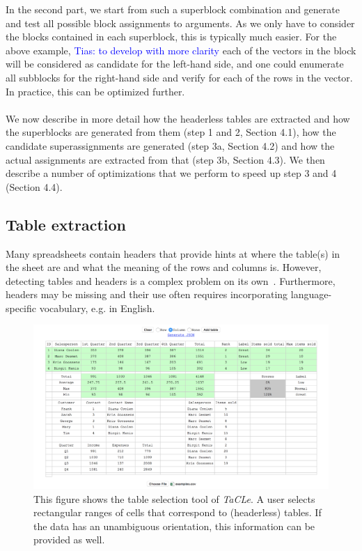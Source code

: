 \documentclass{IEEEtran}
\newcommand{\tias}[1]{\textcolor{blue}{{\sc Tias:} #1}\xspace}
\newcommand{\format}[1]{\textit{#1}\xspace}
\newcommand{\sname}{\format{TaCLe}}
\theoremstyle{definition}
\begin{document}
In the second part, we start from such a superblock combination and generate and test all possible block assignments to arguments. As we only have to consider the blocks contained in each superblock, this is typically much easier. For the above example, \tias{to develop with more clarity} each of the vectors in the block will be considered as candidate for the left-hand side, and one could enumerate all subblocks for the right-hand side and verify for each of the rows in the vector. In practice, this can be optimized further.
\\\\
We now describe in more detail how the headerless tables are extracted and how the superblocks are generated from them (step 1 and 2, Section 4.1), how the candidate superassignments are generated (step 3a, Section 4.2) and how the actual assignments are extracted from that (step 3b, Section 4.3). We then describe a number of optimizations that we perform to speed up step 3 and 4 (Section 4.4).





\subsection{Table extraction}
\label{sec:table_extraction}
Many spreadsheets contain headers that provide hints at where the table(s) in the sheet are and what the meaning of the rows and columns is. However, detecting tables and headers is a complex problem on its own~\cite{header}. Furthermore, headers may be missing and their use often requires incorporating language-specific vocabulary, e.g. in English.

\begin{figure}[t]
  \centering
  \includegraphics[width=1\linewidth]{figures/tabletool.png}
  \caption{This figure shows the table selection tool of \sname. A user selects rectangular ranges of cells that correspond to (headerless) tables. If the data has an unambiguous orientation, this information can be provided as well.}
  \label{fig:visual_tool}
\end{figure}
\end{document}
